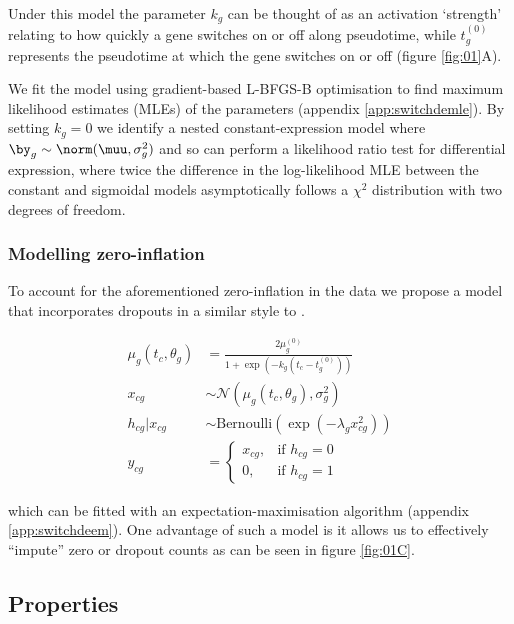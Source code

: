 Under this model the parameter $k_g$ can be thought of as an activation `strength' relating to how quickly a gene switches on or off along pseudotime, while $t^{(0)}_g$ represents the pseudotime at which the gene switches on or off (figure \ref{fig:01}A).

We fit the model using gradient-based L-BFGS-B optimisation to find maximum likelihood estimates (MLEs) of the parameters (appendix \ref{app:switchdemle}). By setting $k_g = 0$ we identify a nested constant-expression model where $\by_g \sim \norm(\muu, \sigma^2_g)$ and so can perform a likelihood ratio test for differential expression, where twice the difference in the log-likelihood MLE between the constant and sigmoidal models asymptotically follows a $\chi^2$ distribution with two degrees of freedom.

\subsubsection{Modelling zero-inflation}

To account for the aforementioned zero-inflation in the data we propose a model that incorporates dropouts in a similar style to \cite{pierson2015zifa}.

\begin{equation}
\begin{aligned}
\mu_g(t_c, \theta_g) & = \frac{2 \mu^{(0)}_g}{1 + \exp\left(-k_g(t_c - t^{(0)}_g)\right)} \\
x_{cg} & \sim \mathcal{N}(\mu_g(t_c, \theta_g), \sigma_g^2) \\
h_{cg} | x_{cg} & \sim \mathrm{Bernoulli}(\exp(-\lambda_g x_{cg}^2)) \\
    y_{cg} &=
\begin{cases}
    x_{cg} ,& \text{if } h_{cg} = 0\\
    0,  & \text{if } h_{cg} = 1
\end{cases}
\end{aligned}
\end{equation}

which can be fitted with an expectation-maximisation algorithm (appendix \ref{app:switchdeem}). One advantage of such a model is it allows us to effectively ``impute'' zero or dropout counts as can be seen in figure \ref{fig:01C}.


\subsection{Properties}

